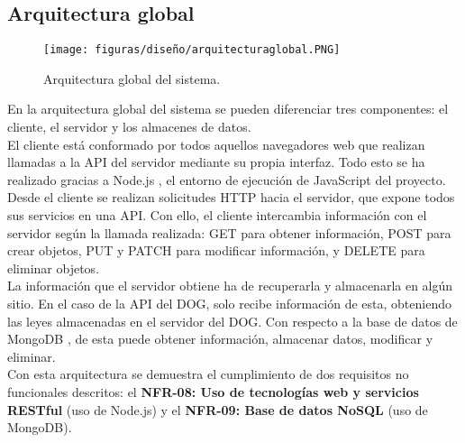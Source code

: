 \subsection{Arquitectura global}

\begin{figure}[H]
\centerline{\texttt{[image: figuras/diseño/arquitecturaglobal.PNG]}}
\caption{Arquitectura global del sistema.}
\label{enlaceArquitecturaGlobal}
\end{figure}

En la arquitectura global del sistema se pueden diferenciar tres componentes: el cliente, el servidor y los almacenes de datos.
\\

El cliente está conformado por todos aquellos navegadores web que realizan llamadas a la API del servidor mediante su propia interfaz. Todo esto se ha realizado gracias a Node.js \cite{nodejs}, el entorno de ejecución de JavaScript del proyecto.
\\

Desde el cliente se realizan solicitudes HTTP hacia el servidor, que expone todos sus servicios en una API. Con ello, el cliente intercambia información con el servidor según la llamada realizada: GET para obtener información, POST para crear objetos, PUT y PATCH para modificar información, y DELETE para eliminar objetos.
\\

La información que el servidor obtiene ha de recuperarla y almacenarla en algún sitio. En el caso de la API del DOG, solo recibe información de esta, obteniendo las leyes almacenadas en el servidor del DOG. Con respecto a la base de datos de MongoDB \cite{mongodb}, de esta puede obtener información, almacenar datos, modificar y eliminar.
\\

Con esta arquitectura se demuestra el cumplimiento de dos requisitos no funcionales descritos: el {\bf NFR-08: Uso de tecnologías web y servicios RESTful} (uso de Node.js) y el {\bf NFR-09: Base de datos NoSQL} (uso de MongoDB).